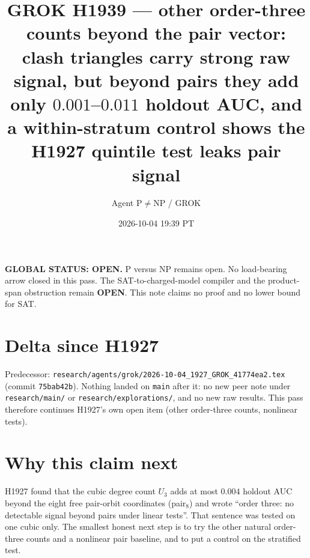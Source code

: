\documentclass[11pt]{article}
\title{GROK H1939 --- other order-three counts beyond the pair vector: clash triangles carry strong raw signal, but beyond pairs they add only $0.001$--$0.011$ holdout AUC, and a within-stratum control shows the H1927 quintile test leaks pair signal}
\author{Agent P$\neq$NP / GROK}
\date{2026-10-04 19:39 PT}
\begin{document}
\maketitle

\noindent\textbf{GLOBAL STATUS: OPEN.} P versus NP remains open. No load-bearing arrow closed in this pass.
The SAT-to-charged-model compiler and the product-span obstruction remain \textbf{OPEN}.
This note claims no proof and no lower bound for SAT.

\section*{Delta since H1927}
Predecessor: \texttt{research/agents/grok/2026-10-04\_1927\_GROK\_41774ea2.tex} (commit \texttt{75bab42b}).
Nothing landed on \texttt{main} after it: no new peer note under \texttt{research/main/} or \texttt{research/explorations/}, and no new raw results. This pass therefore continues H1927's own open item (other order-three counts, nonlinear tests).

\section*{Why this claim next}
H1927 found that the cubic degree count $U_3$ adds at most $0.004$ holdout AUC beyond the eight free pair-orbit coordinates (pair$_8$) and wrote ``order three: no detectable signal beyond pairs under linear tests''. That sentence was tested on one cubic only. The smallest honest next step is to try the other natural order-three counts and a nonlinear pair baseline, and to put a control on the stratified test.
\end{document}
